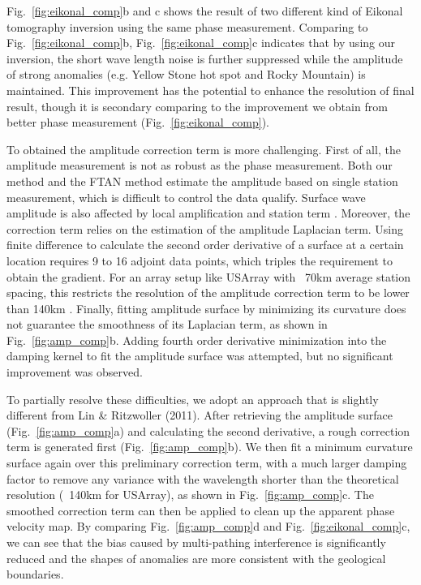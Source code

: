 \documentclass[referee]{gji}
\begin{document}
Fig.~\ref{fig:eikonal_comp}b and c shows the result of two different kind of Eikonal tomography inversion using the same phase measurement. Comparing to Fig.~\ref{fig:eikonal_comp}b, Fig.~\ref{fig:eikonal_comp}c indicates that by using our inversion, the short wave length noise is further suppressed while the amplitude of strong anomalies (e.g. Yellow Stone hot spot and Rocky Mountain) is maintained. This improvement has the potential to enhance the resolution of final result, though it is secondary comparing to the improvement we obtain from better phase measurement (Fig.~\ref{fig:eikonal_comp}). 

To obtained the amplitude correction term is more challenging. First of all, the amplitude measurement is not as robust as the phase measurement. Both our method and the FTAN method estimate the amplitude based on single station measurement, which is difficult to control the data qualify. Surface wave amplitude is also affected by local amplification and station term \cite{Lin:2012la,Eddy:2013la}. Moreover, the correction term relies on the estimation of the amplitude Laplacian term. Using finite difference to calculate the second order derivative of a surface at a certain location requires 9 to 16 adjoint data points, which triples the requirement to obtain the gradient. For an array setup like USArray with ~70km average station spacing, this restricts the resolution of the amplitude correction term to be lower than 140km \cite{Lin:2011fw}. Finally, fitting amplitude surface by minimizing its curvature does not guarantee the smoothness of its Laplacian term, as shown in Fig.~\ref{fig:amp_comp}b. Adding fourth order derivative minimization into the damping kernel to fit the amplitude surface was attempted, but no significant improvement was observed.

To partially resolve these difficulties, we adopt an approach that is slightly different from Lin \& Ritzwoller (2011). After retrieving the amplitude surface (Fig.~\ref{fig:amp_comp}a) and calculating the second derivative, a rough correction term is generated first (Fig.~\ref{fig:amp_comp}b). We then fit a minimum curvature surface again over this preliminary correction term, with a much larger damping factor to remove any variance with the wavelength shorter than the theoretical resolution (~140km for USArray), as shown in Fig.~\ref{fig:amp_comp}c. The smoothed correction term can then be applied to clean up the apparent phase velocity map. By comparing Fig.~\ref{fig:amp_comp}d and Fig.~\ref{fig:eikonal_comp}c, we can see that the bias caused by multi-pathing interference is significantly reduced and the shapes of anomalies are more consistent with the geological boundaries. 
\end{document}
